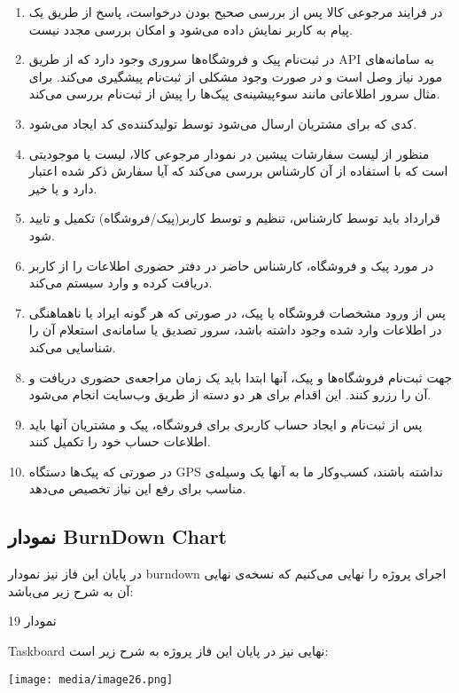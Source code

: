 \documentclass[]{article}
\begin{document}
\begin{enumerate}
\def\labelenumi{\arabic{enumi})}
\item
  در فرایند مرجوعی کالا پس از بررسی صحیح بودن درخواست، پاسخ از طریق یک
  پیام به کاربر نمایش داده می‌شود و امکان بررسی مجدد نیست.
\item
  در ثبت‌نام پیک و فروشگاه‌ها سروری وجود دارد که از طریق API به
  سامانه‌های مورد نیاز وصل است و در صورت وجود مشکلی از ثبت‌نام پیشگیری
  می‌کند. برای مثال سرور اطلاعاتی مانند سوءپیشینه‌ی پیک‌ها را پیش از
  ثبت‌نام بررسی می‌کند.
\item
  کدی که برای مشتریان ارسال می‌شود توسط تولید‌کننده‌ی کد ایجاد می‌شود.
\item
  منظور از لیست سفارشات پیشین در نمودار مرجوعی کالا، لیست یا موجودیتی
  است که با استفاده از آن کارشناس بررسی می‌کند که آیا سفارش ذکر شده
  اعتبار دارد و یا خیر.
\item
  قرارداد باید توسط کارشناس، تنظیم و توسط کاربر(پیک/فروشگاه) تکمیل و
  تایید شود.
\item
  در مورد پیک و فروشگاه، کارشناس حاضر در دفتر حضوری اطلاعات را از کاربر
  دریافت کرده و وارد سیستم می‌کند.
\item
  پس از ورود مشخصات فروشگاه یا پیک، در صورتی که هر گونه ایراد یا
  ناهماهنگی در اطلاعات وارد شده وجود داشته باشد، سرور تصدیق یا سامانه‌ی
  استعلام آن را شناسایی می‌کند.
\item
  جهت ثبت‌نام فروشگاه‌ها و پیک، آنها ابتدا باید یک زمان مراجعه‌ی حضوری
  دریافت و آن را رزرو کنند. این اقدام برای هر دو دسته از طریق وب‌سایت
  انجام می‌شود.
\item
  پس از ثبت‌نام و ایجاد حساب کاربری برای فروشگاه، پیک و مشتریان آنها
  باید اطلاعات حساب خود را تکمیل کنند.
\item
  در صورتی که پیک‌ها دستگاه GPS نداشته باشند، کسب‌وکار ما به آنها یک
  وسیله‌ی مناسب برای رفع این نیاز تخصیص می‌دهد.
\end{enumerate}

\subsection{نمودار BurnDown
Chart}\label{ux646ux645ux648ux62fux627ux631-burndown-chart-2}

در پایان این فاز نیز نمودار burndown اجرای پروژه را نهایی می‌کنیم که
نسخه‌ی نهایی آن به شرح زیر می‌باشد:

نمودار 19

Taskboard نهایی نیز در پایان این فاز پروژه به شرح زیر است:

\texttt{[image: media/image26.png]}
\end{document}
